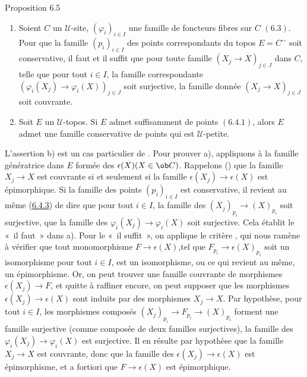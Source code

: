 \documentclass[10pt]{../fichiers-configuration-latex/smfart}
\begin{document}
\begin{enonce*}{Proposition 6.5}
\begin{enumerate}
\renewcommand{\theenumi}{\alph{enumi}}
\renewcommand{\labelenumi}{\theenumi)}
\item Soient $C$ un $𝒰$-site, $(\varphi_i)_{i\in I}$ une
famille de foncteurs fibres sur $C$ $(\hyperref[IV.subsec6.3]{6.3})$. Pour que
la famille $(p_i)_{i\in I}$ des points correspondants du topos
$E=C^{\sim}$ soit conservative, il faut et il suffit que pour toute
famille $(X_j\rightarrow X)_{j\in J}$ dans $C$, telle que pour tout
$i\in I$, la famille correspondante $(\varphi_i(X_j)\rightarrow
\varphi_i(X))_{j\in J}$ soit surjective, la famille donnée
$(X_j\rightarrow X)_{j\in J}$ soit couvrante.

\item Soit $E$ un $𝒰$-topos. Si $E$ admet suffisamment de
points $(\hyperref[IV.def6.4.1]{6.4.1})$, alors $E$ admet une famille
conservative de points qui est $𝒰$-petite.
\end{enumerate}
\end{enonce*}



L'assertion b) est un cas particulier de . Pour
prouver a), appliquons  à la famille génératrice dans
$E$ formée des $\epsilon(X)(X\in \ob C)$. Rappelons
() que la famille $X_j\rightarrow X$ est couvrante
si et seulement si la famille $\epsilon(X_j)\rightarrow \epsilon(X)$
est épimorphique. Si la famille des points $(p_i)_{i\in I}$ est
conservative, il revient au même (\hyperref[IV.subsubsec6.4.3]{6.4.3}) de dire
que pour tout $i\in I$, la famille des $(X_j)_{p_i}\rightarrow
(X)_{p_i}$ soit surjective, \ie que la famille des
$\varphi_i(X_j)\rightarrow \varphi_i(X)$ soit surjective. Cela
établit le « il faut »  dans a). Pour le « il suffit », on
applique le critère , qui nous ramène à vérifier que
tout monomorphisme $F\rightarrow \epsilon(X)$,\pageoriginale tel que
$F_{p_i}\rightarrow \epsilon(X)_{p_i}$ soit un isomorphisme pour
tout $i\in I$, est un isomorphisme, ou ce qui revient au même, un
épimorphisme. Or, on peut trouver une famille couvrante de
morphismes $\epsilon(X_j)\rightarrow F$, et quitte à raffiner
encore, on peut supposer que les morphismes
$\epsilon(X_j)\rightarrow \epsilon(X)$ sont induits par des
morphismes $X_j\rightarrow X$. Par hypothèse, pour tout $i\in I$,
les morphismes composés $(X_j)_{p_i}\rightarrow F_{p_i}\rightarrow
(X)_{p_i}$ forment une famille surjective (comme composée de deux
familles surjectives), \ie la famille des $\varphi_i(X_j)\rightarrow
\varphi_{i}(X)$ est surjective. Il en résulte par hypothèse que la
famille $X_{j}\to X$ est couvrante, donc que la famille des
$\epsilon(X_j)\rightarrow \epsilon(X)$ est épimorphisme, et a
fortiori que $F\rightarrow \epsilon(X)$ est épimorphique.
\end{document}

